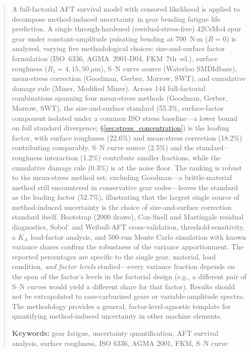 \documentclass[twocolumn,12pt,a4paper]{article}
\begin{document}
\begin{abstract}
\label{sec:abstract}

A full-factorial AFT survival model with censored likelihood is
applied to decompose method-induced uncertainty in gear bending fatigue
life prediction. A single through-hardened (residual-stress-free)
42CrMo4 spur gear under constant-amplitude pulsating bending at
700~N$\cdot$m ($R=0$) is analyzed, varying five methodological choices:
size-and-surface factor formulation (ISO~6336, AGMA~2001-D04,
FKM~7th~ed.), surface roughness ($R_z=4,15,50~\mu$m), S--N curve
source (Waterloo SMDIdbase), mean-stress correction (Goodman, Gerber,
Morrow, SWT), and cumulative damage rule (Miner, Modified Miner).
Across 144 full-factorial combinations spanning four mean-stress
methods (Goodman, Gerber, Morrow, SWT), the size-and-surface standard
(55.3\%, surface-factor component isolated under a common ISO stress
baseline---a lower bound on full standard divergence;
\S\ref{sec:stress_concentration}) is the leading factor, with
surface roughness (22.6\%) and mean-stress correction (18.2\%)
contributing comparably. S--N curve source (2.5\%) and the
standard--roughness interaction (1.2\%) contribute smaller fractions,
while the cumulative damage rule (0.3\%) is at the noise floor. The
ranking is robust to the mean-stress method
set: excluding Goodman---a brittle-material method still encountered
in conservative gear codes---leaves the standard as the leading
factor (52.7\%), illustrating that the largest single source of
method-induced uncertainty is the choice of size-and-surface
correction standard itself. Bootstrap (2000 draws), Cox-Snell and Martingale
residual diagnostics, Sobol' and Weibull-AFT cross-validation,
threshold-sensitivity, a $K_A$ load-factor analysis, and 500-run
Monte Carlo simulation with known variance shares confirm
the robustness of the variance apportionment.
The reported percentages are specific to the single gear, material, load
condition, \emph{and factor levels} studied---every variance fraction
depends on the span of the factor's levels in the factorial design
(e.g., a different pair of S--N curves would yield a different share
for that factor). Results should not be extrapolated to case-carburized
gears or variable-amplitude spectra. The methodology provides a
general, factor-level-agnostic template for quantifying
method-induced uncertainty in other machine elements.

\textbf{Keywords:} gear fatigue, uncertainty quantification, AFT survival analysis,
surface roughness, ISO 6336, AGMA 2001, FKM, S--N curve
\end{abstract}
\end{document}
